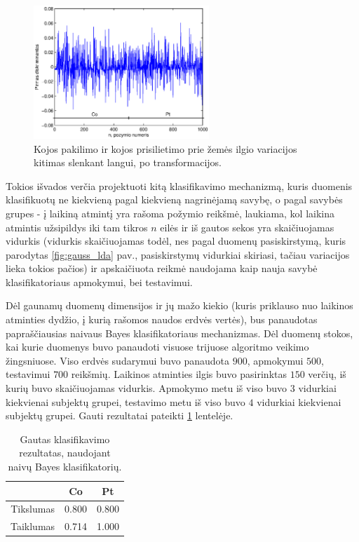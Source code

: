 \documentclass[]{vgtuef}
\begin{document}
\begin{figure}
	\centering
	\includegraphics[width=250px]{figures/11_sample_testing}
	\caption{Kojos pakilimo ir kojos prisilietimo prie žemės ilgio variacijos kitimas slenkant langui, po transformacijos.}
	\label{fig:testing_sample}
\end{figure}

Tokios išvados verčia projektuoti kitą klasifikavimo mechanizmą, kuris duomenis klasifikuotų ne kiekvieną pagal kiekvieną nagrinėjamą savybę, o pagal savybės grupes - į laikiną atmintį yra rašoma požymio reikšmė, laukiama, kol laikina atmintis užsipildys iki tam tikros $n$ eilės ir iš gautos sekos yra skaičiuojamas vidurkis (vidurkis skaičiuojamas todėl, nes pagal duomenų pasiskirstymą, kuris parodytas \ref{fig:gauss_lda} pav., pasiskirstymų vidurkiai skiriasi, tačiau variacijos lieka tokios pačios) ir apskaičiuota reikmė naudojama kaip nauja savybė klasifikatoriaus apmokymui, bei testavimui. 

Dėl gaunamų duomenų dimensijos ir jų mažo kiekio (kuris priklauso nuo laikinos atminties dydžio, į kurią rašomos naudos erdvės vertės), bus panaudotas papraščiausias naivaus Bayes klasifikatoriaus mechanizmas. Dėl duomenų stokos, kai kurie duomenys buvo panaudoti visuose trijuose algoritmo veikimo žingsniuose. Viso erdvės sudarymui buvo panaudota $900$, apmokymui $500$, testavimui $700$ reikšmių. Laikinos atminties ilgis buvo pasirinktas $150$ verčių, iš kurių buvo skaičiuojamas vidurkis. Apmokymo metu iš viso buvo $3$ vidurkiai kiekvienai subjektų grupei, testavimo metu iš viso buvo $4$ vidurkiai kiekvienai subjektų grupei. Gauti rezultatai pateikti \ref{table:classification_results} lentelėje.

\begin{table}
	\centering
	\caption{Gautas klasifikavimo rezultatas, naudojant naivų Bayes klasifikatorių.}
	\label{table:classification_results}
	\begin{tabular}{|c|c|c|} \hline
		& Co & Pt \\ \hline
    Tikslumas & 0.800 & 0.800 \\ \hline
    Taiklumas & 0.714 & 1.000 \\ \hline
	\end{tabular}
\end{table}
\end{document}
